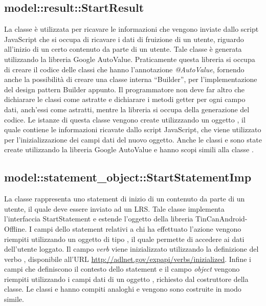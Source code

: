 \documentclass[../Tesi.tex]{subfiles}
\begin{document}
		\subsection{model::result::StartResult}
		La classe  è utilizzata per ricavare le informazioni che vengono inviate dallo script JavaScript che si occupa di ricavare i dati di fruizione di un utente, riguardo all'inizio di un certo contenuto da parte di un utente. Tale classe è generata utilizzando la libreria Google AutoValue. Praticamente questa libreria si occupa di creare il codice delle classi che hanno l'annotazione \textit{@AutoValue}, fornendo anche la possibilità di creare una classe interna ``Builder'', per l'implementazione del design pattern Builder appunto. Il programmatore non deve far altro che dichiarare le classi come astratte e dichiarare i metodi getter per ogni campo dati, anch'essi come astratti, mentre la libreria si occupa della generazione del codice. Le istanze di questa classe vengono create utilizzzando un oggetto , il quale contiene le informazioni ricavate dallo script JavaScript, che viene utilizzato per l'inizializzazione dei campi dati del nuovo oggetto. Anche le classi  e  sono state create utilizzando la libreria Google AutoValue e hanno scopi simili alla classe .

		\subsection{model::statement\_object::StartStatementImp}
		La classe  rappresenta uno statement di inizio di un contenuto da parte di un utente, il quale deve essere inviato ad un LRS. Tale classe implementa l'interfaccia StartStatement e estende l'oggetto  della libreria TinCanAndroid-Offline. I campi dello statement relativi a chi ha effettuato l'azione vengono riempiti utilizzando un oggetto di tipo , il quale permette di accedere ai dati dell'utente loggato. Il campo \textit{verb} viene inizializzato utilizzando la definizione del verbo , disponibile all'URL \url{http://adlnet.gov/expapi/verbs/inizialized}. Infine i campi che definiscono il contesto dello statement e il campo \textit{object} vengono riempiti utilizzando i campi dati di un oggetto , richiesto dal costruttore della classe. Le classi  e  hanno compiti analoghi e vengono sono costruite in modo simile.
\end{document}
